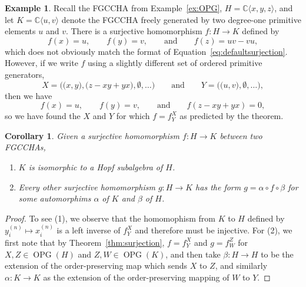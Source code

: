 \documentclass[11pt]{amsart}
\newtheorem{corollary}[theorem]{Corollary}
\theoremstyle{definition}
\newtheorem{example}[theorem]{Example}
\numberwithin{equation}{section}
\def\CC{{\mathbb C}}
\newcommand{\FGCCHA}{\textsf{FGCCHA}\xspace}
\newcommand{\FGCCHAs}{\textsf{FGCCHA}s\xspace}
\newcommand{\OPG}{\operatorname{OPG}}
\begin{document}
\begin{example}
Recall the \FGCCHA from Example~\ref{ex:OPG}, $H = \CC\langle x, y, z \rangle$, and let $K = \CC\langle u, v \rangle$ denote the \FGCCHA freely generated by two degree-one primitive elements $u$ and $v$.  
There is a surjective homomorphism $f: H \to K$ defined by
\[
f(x) = u,
\qquad
f(y) = v,
\qquad\text{and}\qquad
f(z) = uv-vu,
\]
which does not obviously match the format of Equation~\eqref{eq:defaultsurjection}.  However, if we write $f$ using a slightly different set of ordered primitive generators,
\[
X = \Big(\big( x, y\big), \big( z - xy + yx \big), \emptyset, \ldots \Big)
\qquad
\text{and}
\qquad
Y =  \Big(\big( u, v\big), \emptyset, \ldots \Big),
\]
then we have 
\[
f(x) = u,
\qquad
f(y) = v,
\qquad\text{and}\qquad
f(z - xy + yx) = 0,
\]
so we have found the $X$ and $Y$ for which $f = f^{X}_{Y}$ as predicted by the theorem.
\end{example}

\begin{corollary}
Given a surjective homomorphism $f: H \to K$ between two \FGCCHAs,
\begin{enumerate}
\item $K$ is isomorphic to a Hopf subalgebra of $H$.

\item Every other surjective homomorphism $g: H \to K$ has the form $g = \alpha \circ f \circ \beta$ for some automorphims $\alpha$ of $K$ and $\beta$ of $H$.

\end{enumerate}
\end{corollary}
\begin{proof}
To see (1), we observe that the homomophism from $K$ to $H$ defined by $y^{(n)}_{i} \mapsto x^{(n)}_{i}$ is a left inverse of $f^{X}_{Y}$ and therefore must be injective.  For (2), we first note that by Theorem~\ref{thm:surjection}, $f = f^{X}_{Y}$ and $g = f^{Z}_{W}$ for $X, Z \in \OPG(H)$ and $Z, W \in \OPG(K)$, and then take $\beta: H \to H$ to be the extension of the order-preserving map which sends $X$ to $Z$, and similarly $\alpha: K \to K$ as the extension of the order-preserving mapping of $W$ to $Y$.
\end{proof}
\end{document}
